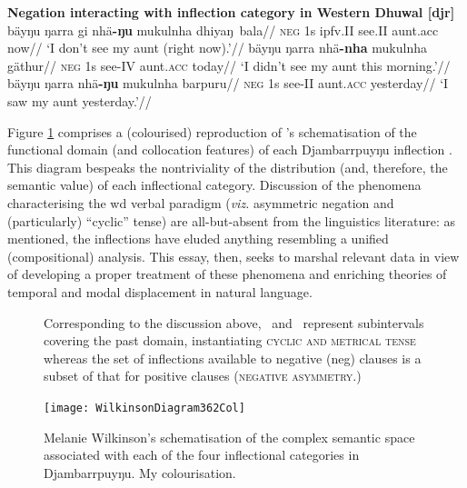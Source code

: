 \pex \textbf{Negation interacting with inflection category in Western Dhuwal [\gls{djr}]}
\a {}\begingl\gla bäyŋu ŋarra gi nhä\textbf{-ŋu} mukulnha dhiyaŋ~bala//
\glb \textsc{neg} 1s \gls{ipfv}.\gls{II} see.\gls{II} aunt.\gls{acc} now//
\glft`I don't see my aunt (right now).'//\endgl
\a\begingl\gla {}bäyŋu ŋarra nhä\textbf{-nha} mukulnha gäthur//
\glb \textsc{neg} 1s see-\gls{IV} aunt.\textsc{acc} today//
\glft`I didn't see my aunt this morning.'//\endgl
\a\begingl\gla{}bäyŋu ŋarra nhä\textbf{-ŋu} mukulnha barpuru//
\glb \textsc{neg} 1s see-\gls{II} aunt.\textsc{acc} yesterday//
\glft`I saw my aunt yesterday.'//\endgl
\xe 




 Figure \ref{WilkDia} comprises a (colourised) reproduction of \citeauthor{Wilkinson1991}'s schematisation of the functional domain (and collocation features) of each Djambarrpuyŋu inflection \citeyearpar[326]{Wilkinson1991}. This diagram bespeaks the nontriviality of the distribution (and, therefore, the semantic value) of each inflectional category. Discussion of the phenomena characterising the \gls{wd} verbal paradigm (\textit{viz.} asymmetric negation and (particularly) ``cyclic'' tense) are all-but-absent from the linguistics literature: as mentioned, the inflections have eluded anything resembling a unified (compositional) analysis. This essay, then, seeks to marshal relevant data in view of developing a proper treatment of these phenomena and enriching theories of temporal and modal displacement in natural language. 
 

\begin{figure}\caption[A multidimensional schema for Djambarrpuyŋu inflectional semantics \citep{Wilkinson1991}]{Melanie Wilkinson's \citeyearpar[326]{Wilkinson1991} schematisation of the complex semantic space associated with each of the four inflectional categories in Djambarrpuyŋu. My colourisation.
}\label{WilkDia}

Corresponding to the discussion above, \I\ and \III\ represent subintervals covering the past domain, instantiating \textsc{cyclic and metrical tense} whereas the set of inflections available to negative (\gls{neg}) clauses is a subset of that for positive clauses (\textsc{negative asymmetry}.)

\centering
	\texttt{[image: WilkinsonDiagram362Col]}
\end{figure}

